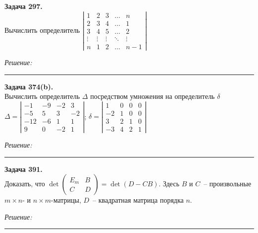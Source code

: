 \documentclass[a4paper, 12pt]{article}
\newenvironment{problem}[2][Задача]
{ \begin{mdframed}[backgroundcolor=gray!10] \textbf{#1 #2.} \\}
	{  \end{mdframed}}
\newenvironment{solution}
{\textit{Решение:}\vspace{.2cm}\\}
{\vspace{.1cm}\noindent\rule{7in}{1.5pt}}
\begin{document}
\begin{problem}{297}
Вычислить определитель 
$\left| \begin{array}{ccccc}1 & 2 & 3 & \ldots & n \\ 2 & 3 & 4 & \ldots & 1 \\ 3 & 4 & 5 & \ldots & 2 \\ \vdots & \vdots & \vdots & \ddots & \vdots \\ n & 1 & 2 & \ldots & n-1 \end{array} \right|$

\end{problem}
\begin{solution}


\end{solution} 

\begin{problem}{374(b)}
Вычислить определитель $\Delta$ посредством умножения на определитель $\delta$\\
$\Delta=\left| \begin{array}{rrrr} -1 & -9 & -2 & 3\\ -5 & 5 & 3 & -2\\ -12 & -6 & 1 & 1 \\ 9 & 0 & -2 & 1\end{array}\right|$;
$\delta=\left| \begin{array}{rrrr} 1 & 0 & 0 & 0\\ -2 & 1 & 0 & 0\\ 3 & 2 & 1 & 0 \\ -3 & 4 & 2 & 1\end{array}\right|$

\end{problem}
\begin{solution}


\end{solution} 

\begin{problem}{391}
Доказать, что $\det\left(\begin{array}{cc}E_m & B\\C & D\end{array}\right)=\det(D-CB)$.
Здесь $B$ и $C$~-- произвольные $m\times n$- и $n\times m$-матрицы, $D$~-- квадратная матрица порядка $n$.

\end{problem}
\begin{solution}


\end{solution} 
\end{document}
